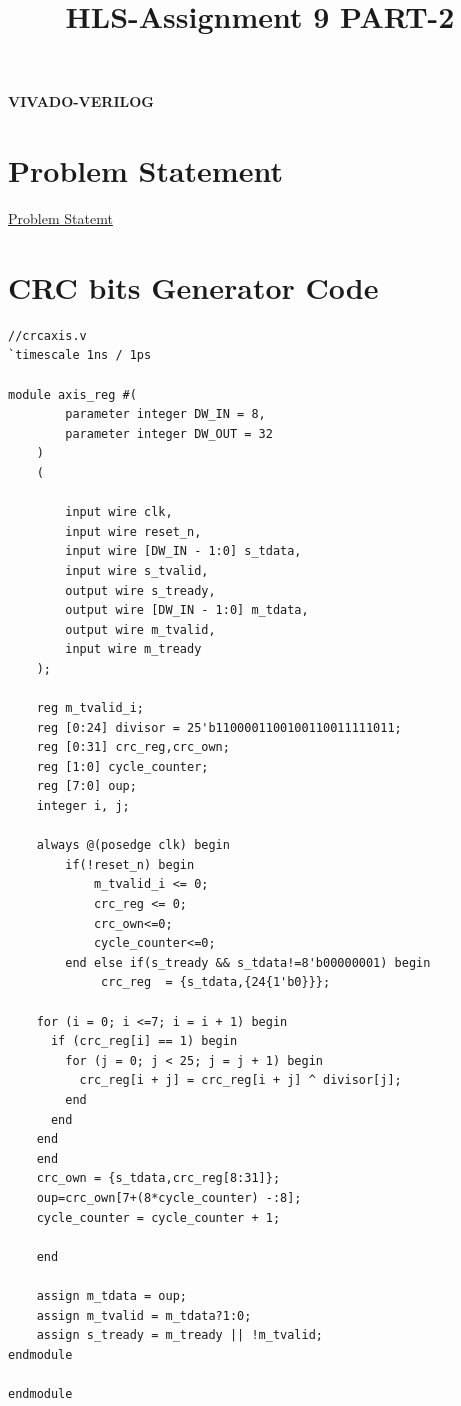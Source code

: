 \documentclass{article}
\title{
HLS-Assignment 9 PART-2
}
\begin{document}
\maketitle
\hfill \textbf{VIVADO-VERILOG}
\section{Problem Statement}
\href{run:./problem_statement.pdf} {Problem Statemt}
\vspace{1cm}

\section{CRC bits Generator Code}
\begin{lstlisting}
//crcaxis.v
`timescale 1ns / 1ps

module axis_reg #(
        parameter integer DW_IN = 8,
        parameter integer DW_OUT = 32
    )
    (
        
        input wire clk,
        input wire reset_n,
        input wire [DW_IN - 1:0] s_tdata,
        input wire s_tvalid,
        output wire s_tready,
        output wire [DW_IN - 1:0] m_tdata,
        output wire m_tvalid,
        input wire m_tready
    );
    
    reg m_tvalid_i;
    reg [0:24] divisor = 25'b1100001100100110011111011;
    reg [0:31] crc_reg,crc_own;
    reg [1:0] cycle_counter;
    reg [7:0] oup;
    integer i, j;

    always @(posedge clk) begin
        if(!reset_n) begin
            m_tvalid_i <= 0;
            crc_reg <= 0;
            crc_own<=0;
            cycle_counter<=0;
        end else if(s_tready && s_tdata!=8'b00000001) begin
             crc_reg  = {s_tdata,{24{1'b0}}};
    
    for (i = 0; i <=7; i = i + 1) begin
      if (crc_reg[i] == 1) begin
        for (j = 0; j < 25; j = j + 1) begin
          crc_reg[i + j] = crc_reg[i + j] ^ divisor[j];
        end
      end
    end
    end
    crc_own = {s_tdata,crc_reg[8:31]};
    oup=crc_own[7+(8*cycle_counter) -:8];
    cycle_counter = cycle_counter + 1;
        
    end

    assign m_tdata = oup;
    assign m_tvalid = m_tdata?1:0;
    assign s_tready = m_tready || !m_tvalid;
endmodule

endmodule
\end{lstlisting}
\vspace{13cm}
\end{document}
